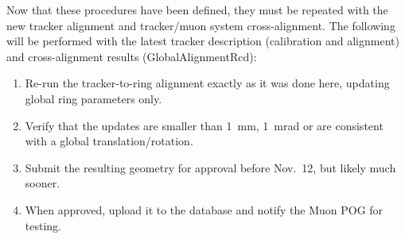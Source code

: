 \documentclass[12pt]{article}
\begin{document}
Now that these procedures have been defined, they must be repeated
with the new tracker alignment and tracker/muon system
cross-alignment.  The following will be performed with the latest
tracker description (calibration and alignment) and cross-alignment
results (GlobalAlignmentRcd):
\begin{enumerate}
\item Re-run the tracker-to-ring alignment exactly as it was done
  here, updating global ring parameters only.
\item Verify that the updates are smaller than 1~mm, 1~mrad or are
  consistent with a global translation/rotation.
\item Submit the resulting geometry for approval before Nov.~12, but
  likely much sooner.
\item When approved, upload it to the database and notify the Muon POG for testing.
\end{enumerate}
\end{document}
